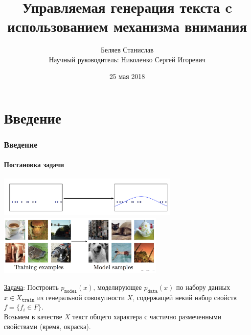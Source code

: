 \documentclass[10pt]{beamer}
\title[Управляемая генерация текста]{Управляемая генерация текста c использованием механизма внимания%
}
\author[Беляев Станислав]{
Беляев Станислав\texorpdfstring{\\ Научный руководитель: Николенко Сергей Игоревич}{}
}
\institute[СПбАУ]
{
Санкт-Петербургский Академический Университет \\
\medskip
\textit{stasbelyaev96@gmail.com}
}
\date{25 мая 2018}
\begin{document}
\begin{frame}
\titlepage
\end{frame}
\section{Введение}
\begin{frame}
\frametitle{Введение}
\framesubtitle{Постановка задачи}

\begin{center}
    \includegraphics[height=2cm]{images/density_estimation.png}\\
    \includegraphics[height=3cm]{images/density_samples.png}
\end{center}

\underline{Задача}: Построить $p_{\texttt{model}}(x)$, моделирующее $p_{\texttt{data}}(x)$ по набору данных $x \in X_{\texttt{train}}$ из генеральной совокупности $X$, содержащей некий набор свойств $f = \{f_i \in F\}$. \\
Возьмем в качестве $X$ текст общего характера с частично размеченными свойствами (время, окраска). %

\end{frame}
\end{document}
